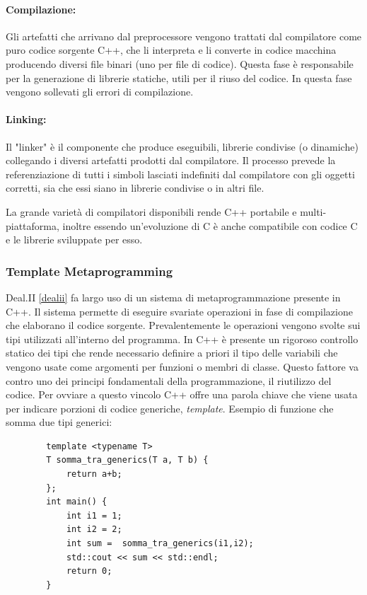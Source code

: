     \paragraph{Compilazione:}\label{c++}
    Gli artefatti che arrivano dal preprocessore vengono trattati dal compilatore come puro codice sorgente
    C++, che li interpreta e li converte in codice macchina producendo diversi file binari (uno per file
    di codice). Questa fase è responsabile per la generazione di librerie statiche, utili per il riuso del codice.
    In questa fase vengono sollevati gli errori di compilazione.\par

    \paragraph{Linking:}
    Il "linker" è il componente che produce eseguibili, librerie condivise (o dinamiche) collegando i diversi
    artefatti prodotti dal compilatore. Il processo prevede la referenziazione di tutti i simboli lasciati indefiniti
    dal compilatore con gli oggetti corretti, sia che essi siano in librerie condivise o in altri file.\par
    \noindent
    \newline
    La grande varietà di compilatori disponibili rende C++ portabile e multi-piattaforma, inoltre essendo
    un'evoluzione di C è anche compatibile con codice C e le librerie sviluppate per esso.

    \subsubsection{Template Metaprogramming}\label{template}
    Deal.II \ref{dealii} fa largo uso di un sistema di metaprogrammazione presente in C++. Il sistema
    permette di eseguire svariate operazioni in fase di compilazione che elaborano il codice sorgente.
    Prevalentemente le operazioni vengono svolte sui tipi utilizzati all'interno del programma.
    In C++ è presente un rigoroso controllo statico dei tipi che rende necessario definire a priori
    il tipo delle variabili che vengono usate come argomenti per funzioni o membri di classe. Questo fattore
    va contro uno dei principi fondamentali della programmazione, il riutilizzo del codice. Per ovviare a questo vincolo
    C++ offre una parola chiave che viene usata per indicare porzioni di codice generiche, \textit{template}.
    Esempio di funzione che somma due tipi generici:
    \begin{verbatim}
        template <typename T>
        T somma_tra_generics(T a, T b) {
            return a+b;
        };
        int main() {
            int i1 = 1;
            int i2 = 2;
            int sum =  somma_tra_generics(i1,i2);
            std::cout << sum << std::endl;
            return 0;
        }
    \end{verbatim}

